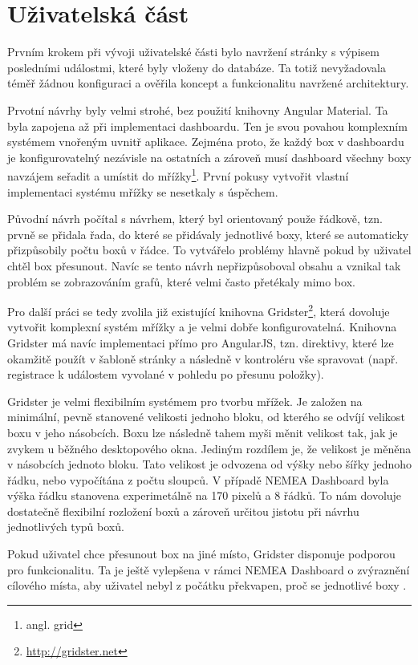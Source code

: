 \section{Uživatelská část}

Prvním krokem při vývoji uživatelské části bylo navržení stránky s výpisem posledními událostmi, které byly vloženy do databáze. Ta totiž nevyžadovala téměř žádnou konfiguraci a ověřila koncept a funkcionalitu navržené architektury.

Prvotní návrhy byly velmi strohé, bez použití knihovny Angular Material. Ta byla zapojena až při implementaci dashboardu. Ten je svou povahou komplexním systémem vnořeným uvnitř aplikace. Zejména proto, že každý box v dashboardu je konfigurovatelný nezávisle na ostatních a zároveň musí dashboard všechny boxy navzájem seřadit a umístit do mřížky\footnote{angl. grid}. První pokusy vytvořit vlastní implementaci systému mřížky se nesetkaly s úspěchem.

Původní návrh počítal s návrhem, který byl orientovaný použe řádkově, tzn. prvně se přidala řada, do které se přidávaly jednotlivé boxy, které se automaticky přizpůsobily počtu boxů v řádce. To vytvářelo problémy hlavně pokud by uživatel chtěl box přesunout. Navíc se tento návrh nepřizpůsoboval obsahu a vznikal tak problém se zobrazováním grafů, které velmi často přetékaly mimo box.

Pro další práci se tedy zvolila již existující knihovna Gridster\footnote{\url{http://gridster.net}}, která dovoluje vytvořit komplexní systém mřížky a je velmi dobře konfigurovatelná. Knihovna Gridster má navíc implementaci přímo pro AngularJS, tzn. direktivy, které lze okamžitě použít v šabloně stránky a následně v kontroléru vše spravovat (např. registrace k událostem vyvolané v pohledu po přesunu položky).

Gridster je velmi flexibilním systémem pro tvorbu mřížek. Je založen na minimální, pevně stanovené velikosti jednoho bloku, od kterého se odvíjí velikost boxu v jeho násobcích. Boxu lze následně tahem myši měnit velikost tak, jak je zvykem u běžného desktopového okna. Jediným rozdílem je, že velikost je měněna v násobcích jednoto bloku. Tato velikost je odvozena od výšky nebo šířky jednoho řádku, nebo vypočítána z počtu sloupců. V případě NEMEA Dashboard byla výška řádku stanovena experimetálně na 170 pixelů a 8 řádků. To nám dovoluje dostatečně flexibilní rozložení boxů a zároveň určitou jistotu při návrhu jednotlivých typů boxů.

Pokud uživatel chce přesunout box na jiné místo, Gridster disponuje podporou pro  funkcionalitu. Ta je ještě vylepšena v rámci NEMEA Dashboard o zvýraznění cílového místa, aby uživatel nebyl z počátku překvapen, proč se jednotlivé boxy .

